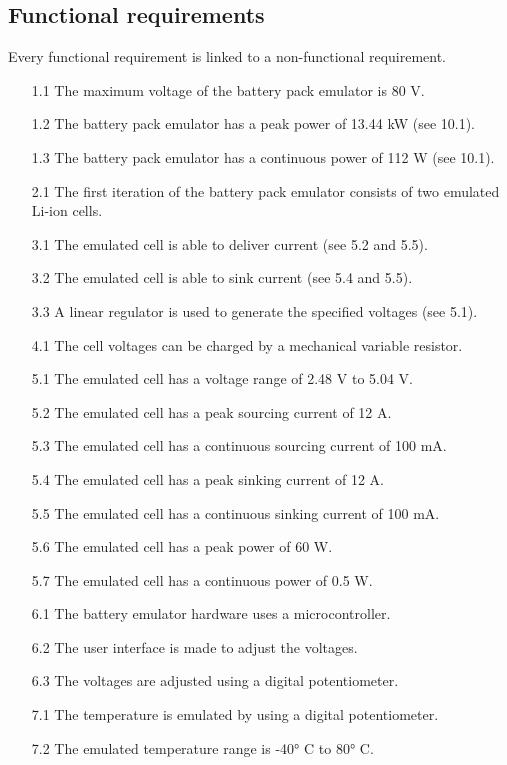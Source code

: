 \subsection{Functional requirements}
Every functional requirement is linked to a non-functional requirement. 
\begin{enumerate}
    \item[1.1] The maximum voltage of the battery pack emulator is 80 V.
    \item[1.2] The battery pack emulator has a peak power of 13.44 kW 
    (see 10.1).
    \item[1.3] The battery pack emulator has a continuous power of 112 W 
    (see 10.1).
    \item[2.1] The first iteration of the battery pack emulator consists of 
    two emulated Li-ion cells.
    \item[3.1] The emulated cell is able to deliver current (see 5.2 and 5.5).
    \item[3.2] The emulated cell is able to sink current (see 5.4 and 5.5).
    \item[3.3] A linear regulator is used to generate the specified voltages 
    (see 5.1).
    \item[4.1] The cell voltages can be charged by a mechanical variable 
    resistor. 
    \item[5.1] The emulated cell has a voltage range of 2.48 V to 5.04 V.
    \item[5.2] The emulated cell has a peak sourcing current of 12 A.
    \item[5.3] The emulated cell has a continuous sourcing current of 100 mA.
    \item[5.4] The emulated cell has a peak sinking current of 12 A.
    \item[5.5] The emulated cell has a continuous sinking current of 100 mA.
    \item[5.6] The emulated cell has a peak power of 60 W.
    \item[5.7] The emulated cell has a continuous power of 0.5 W.
    \item[6.1] The battery emulator hardware uses a microcontroller. 
    \item[6.2] The user interface is made to adjust the voltages. 
    \item[6.3] The voltages are adjusted using a digital potentiometer. 
    \item[7.1] The temperature is emulated by using a digital potentiometer.
    \item[7.2] The emulated temperature range is -40° C to 80° C.

\end{enumerate}
